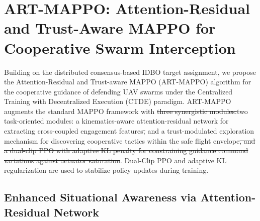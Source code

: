 \documentclass[lettersize,journal]{IEEEtran}
\newcommand{\hladd}[1]{{\color{blue}#1}}
\newcommand{\hldel}[1]{{\color{red}\sout{#1}}}
\begin{document}
\section{ART-MAPPO: Attention-Residual and Trust-Aware MAPPO for Cooperative Swarm Interception}
\label{sec:cooperative_algorithm}


Building on the distributed consensus-based IDBO target assignment, we propose
the Attention-Residual and Trust-aware MAPPO (ART-MAPPO) algorithm for the
cooperative guidance of defending UAV swarms under the Centralized Training
with Decentralized Execution (CTDE) paradigm. ART-MAPPO augments the standard
MAPPO framework with \hldel{three synergistic modules:}\hladd{two
task-oriented modules:} a kinematics-aware attention-residual network for
extracting cross-coupled engagement features\hldel{,}\hladd{ and} a
trust-modulated exploration mechanism for discovering cooperative tactics
within the safe flight envelope\hldel{, and a dual-clip PPO with adaptive KL
penalty for constraining guidance command variations against actuator
saturation}\hladd{. Dual-Clip PPO and adaptive KL regularization are used to
stabilize policy updates during training}.

\subsection{Enhanced Situational Awareness via Attention-Residual Network}
\label{subsec:attention_residual}
\end{document}

